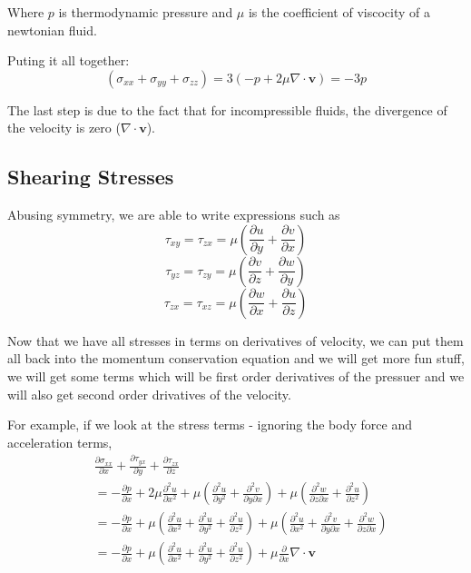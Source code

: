 \documentclass[10pt,a4paper,draft]{article}
\begin{document}
Where $p$ is thermodynamic pressure and $\mu$ is the coefficient of viscocity of a newtonian fluid.

Puting it all together:
$$
\left( \sigma_{xx} + \sigma_{yy} + \sigma_{zz} \right)
=  3\left( -p + 2\mu \nabla \cdot \mathbf{v} \right)
= -3p 
$$

The last step is due to the fact that for incompressible fluids, the divergence of the velocity is zero ($\nabla \cdot \mathbf{v}$).

\subsection{Shearing Stresses}
Abusing symmetry, we are able to write expressions such as 
$$
\tau_{xy} 
= \tau_{zx}
= \mu \left( \frac{\partial u}{\partial y} + \frac{\partial v}{\partial x} \right) 
$$
$$
\tau_{yz}
= \tau_{zy}
= \mu \left( \frac{\partial v}{\partial z} + \frac{\partial w}{\partial y} \right)
$$
$$
\tau_{zx} 
= \tau_{xz}
= \mu \left( \frac{\partial w}{\partial x} + \frac{\partial u}{\partial z} \right)
$$

Now that we have all stresses in terms on derivatives of velocity, we can put them all back into the momentum conservation equation and we will get more fun stuff, we will get some terms which will be first order derivatives of the pressuer and we will also get second order drivatives of the velocity.

For example, if we look at the stress terms - ignoring the body force and acceleration terms,
\begin{equation*}
\begin{split}
& \frac{\partial \sigma_{xx}}{\partial x} 
+ \frac{\partial \tau_{yx}}{\partial y} 
+ \frac{\partial \tau_{zx}}{\partial z}
\\ &=
- \frac{\partial p}{\partial x} + 2\mu \frac{\partial^2 u}{\partial x^2}
+ \mu\left( 
	\frac{\partial^2 u}{\partial y^2} + \frac{\partial^2 v}{\partial y \partial x}
	\right)
+ \mu\left( 
	\frac{\partial^2 w}{\partial z \partial x} + \frac{\partial^2 u}{\partial z^2}
	\right)
\\ &=
-\frac{\partial p}{\partial x}
+ \mu\left( 
	\frac{\partial^2 u}{\partial x^2} + \frac{\partial^2 u}{\partial y^2} + \frac{\partial^2 u}{\partial z^2}
	\right)
+ \mu\left( 
	\frac{\partial^2 u}{\partial x^2} + \frac{\partial^2 v}{\partial y \partial x} + \frac{\partial^2 w}{\partial z \partial x} 
	\right)
\\ &=
-\frac{\partial p}{\partial x}
+ \mu\left( 
	\frac{\partial^2 u}{\partial x^2} + \frac{\partial^2 u}{\partial y^2} + \frac{\partial^2 u}{\partial z^2}
	\right)
+ \mu \frac{\partial}{\partial x} \nabla \cdot \mathbf{v}
\end{split}
\end{equation*}
\end{document}
